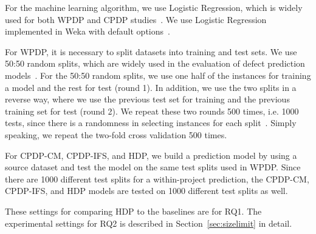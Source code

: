 For the machine learning algorithm, we use Logistic Regression, which is widely
used for both WPDP and CPDP
studies~\cite{Meneely2008,Nam13,Shihab11,Zimmermann09}.
We use Logistic Regression implemented in Weka with default
options~\cite{Weka}.

For WPDP, it is necessary to split datasets into training and test
sets. We use 50:50 random splits, which are widely used in the evaluation of
defect prediction models~\cite{Klas2010,Nam13,Pinzger2008}. For the 50:50 random
splits, we use one half of the instances for training a model and the rest for
test (round 1). In addition, we use the two splits in a reverse way, where we
use the previous test set for training and the previous training set for test
(round 2). We repeat these two rounds 500 times, i.e. 1000 tests, since there
is a randomness in selecting instances for each split~\cite{Arcuri11}. Simply
speaking, we repeat the two-fold cross validation 500 times.

For CPDP-CM, CPDP-IFS, and HDP, we build a 
prediction model by using a source dataset and test the model on the same test
splits used in WPDP. Since there are 1000 different test
splits for a within-project prediction, the CPDP-CM, CPDP-IFS, and HDP models
are tested on 1000 different test splits as well.

These settings for comparing HDP to the baselines are for RQ1. The experimental settings for RQ2 is described in Section~\ref{sec:sizelimit} in detail.

